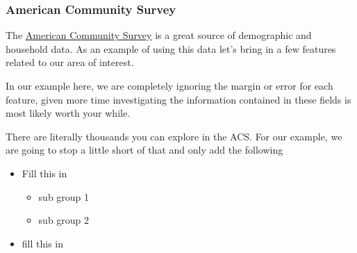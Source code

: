 \documentclass[]{book}
\providecommand{\tightlist}{%
  \setlength{\itemsep}{0pt}\setlength{\parskip}{0pt}}
\theoremstyle{definition}
\theoremstyle{definition}
\theoremstyle{definition}
\theoremstyle{remark}
\begin{document}
\subsubsection{American Community
Survey}\label{american-community-survey}

The \href{https://www.census.gov/programs-surveys/acs/}{American
Community Survey} is a great source of demographic and household data.
As an example of using this data let's bring in a few features related
to our area of interest.

In our example here, we are completely ignoring the margin or error for
each feature, given more time investigating the information contained in
these fields is most likely worth your while.

There are literally thousands you can explore in the ACS. For our
example, we are going to stop a little short of that and only add the
following

\begin{itemize}
\tightlist
\item
  Fill this in

  \begin{itemize}
  \tightlist
  \item
    sub group 1
  \item
    sub group 2
  \end{itemize}
\item
  fill this in
\end{itemize}
\end{document}
